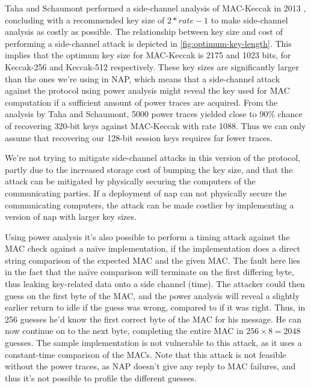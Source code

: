 Taha and Schaumont performed a side-channel analysis of MAC-Keccak in 2013 \cite{keccak_side_channel_analysis}, concluding with a recommended key size of \( 2*rate-1 \) to make side-channel analysis as costly as possible. The relationship between key size and cost of performing a side-channel attack is depicted in \autoref{fig:optimum-key-length}. This implies that the optimum key size for MAC-Keccak is 2175 and 1023 bits, for Keccak-256 and Keccak-512 respectively. These key sizes are significantly larger than the ones we're using in NAP, which means that a side-channel attack against the protocol using power analysis might reveal the key used for MAC computation if a sufficient amount of power traces are acquired. From the analysis by Taha and Schaumont, 5000 power traces yielded close to 90\% chance of recovering 320-bit keys against MAC-Keccak with rate 1088. Thus we can only assume that recovering our 128-bit session keys requires far fewer traces.

We're not trying to mitigate side-channel attacks in this version of the protocol, partly due to the increased storage cost of bumping the key size, and that the attack can be mitigated by physically securing the computers of the communicating parties. If a deployment of \gls{nap} can not physically secure the communicating computers, the attack can be made costlier by implementing a version of \gls{nap} with larger key sizes.

Using power analysis it's also possible to perform a timing attack against the MAC check against a naïve implementation, if the implementation does a direct string comparison of the expected MAC and the given MAC. The fault here lies in the fact that the naïve comparison will terminate on the first differing byte, thus leaking key-related data onto a side channel (time). The attacker could then guess on the first byte of the MAC, and the power analysis will reveal a slightly earlier return to idle if the guess was wrong, compared to if it was right. Thus, in 256 guesses he'd know the first correct byte of the MAC for his message. He can now continue on to the next byte, completing the entire MAC in \( 256 \times 8 = 2048 \) guesses. The sample implementation is not vulnerable to this attack, as it uses a constant-time comparison of the MACs. Note that this attack is not feasible without the power traces, as NAP doesn't give any reply to MAC failures, and thus it's not possible to profile the different guesses.
